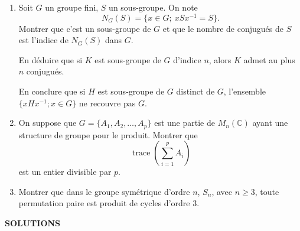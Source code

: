 \begin{enumerate}[label=\arabic*.,leftmargin=2.2em,itemsep=1.1em]
\item Soit $G$ un groupe fini, $S$ un sous-groupe. On note
\[
N_G(S)=\{x\in G;\ xSx^{-1}=S\}.
\]
Montrer que c'est un sous-groupe de $G$ et que le nombre de conjugués de $S$ est l'indice de $N_G(S)$ dans $G$.

En déduire que si $K$ est sous-groupe de $G$ d'indice $n$, alors $K$ admet au plus $n$ conjugués.

En conclure que si $H$ est sous-groupe de $G$ distinct de $G$, l'ensemble $\{xHx^{-1};x\in G\}$ ne recouvre pas $G$.

\item On suppose que $G=\{A_1,A_2,\ldots,A_p\}$ est une partie de $M_n(\mathbb C)$ ayant une structure de groupe pour le produit. Montrer que
\[
\operatorname{trace}\!\left(\sum_{i=1}^{p}A_i\right)
\]
est un entier divisible par $p$.

\item Montrer que dans le groupe symétrique d'ordre $n$, $S_n$, avec $n\ge3$, toute permutation paire est produit de cycles d'ordre $3$.
\end{enumerate}

\clearpage
\begin{center}
{\Large\sffamily\bfseries\color{BellaLavenderDeep} SOLUTIONS}
\end{center}
\vspace{0.8em}

